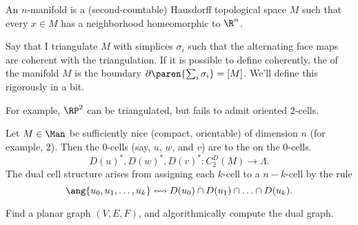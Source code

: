 \begin{defn}
An $n$-manifold is a (second-countable) Hausdorff topological space $M$ such that every $x \in M$ has a neighborhood homeomorphic to $\R^n$. 
\end{defn}

\begin{rem}
Say that I triangulate $M$ with simplices $\sigma_i$ such that the alternating face maps are coherent with the triangulation. 
If it is possible to define coherently, the  of the manifold $M$ is the boundary $\partial \paren{\sum_i \sigma_i} = [M]$. We'll define this rigorously in a bit.

For example, $\RP^2$ can be triangulated, but fails to admit oriented $2$-cells.
\end{rem}

\begin{ex}
    Let $M \in \Man$ be sufficiently nice (compact, orientable) of dimension $n$ (for example, $2$). Then the $0$-cells (say, $u$, $w$, and $v$) are  to the  on the $0$-cells.
    \begin{equation}
        D(u)^*, D(w)^*, D(v)^* \colon C_2^D(M) \to \Lambda.
    \end{equation}
    The dual cell structure arises from assigning each $k$-cell to a $n-k$-cell by the rule
    \begin{equation*}
        \ang{u_0, u_1, \ldots, u_k} \leftrightsquigarrow D(u_0) \cap D(u_1) \cap \ldots \cap D(u_k).
    \end{equation*}
\end{ex}

\begin{todo}[]
    Find a planar graph $(V, E, F)$, and algorithmically compute the dual graph.
\end{todo}
